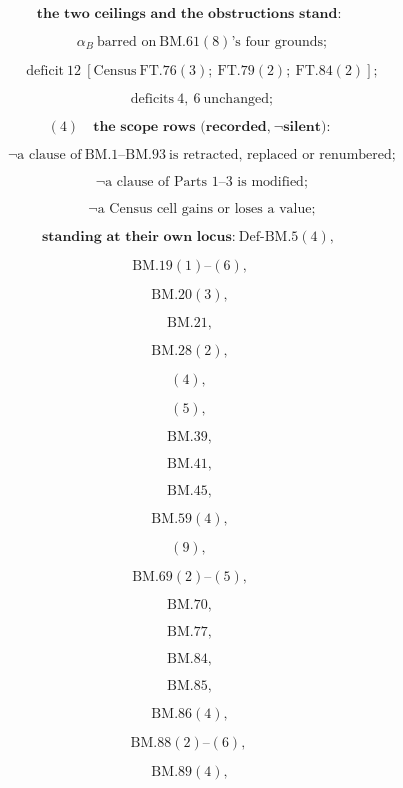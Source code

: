 \documentclass[11pt,openany]{report}
\theoremstyle{canonplain}
\theoremstyle{canondef}
\begin{document}
\[
\textbf{the two ceilings and the obstructions stand:}
\]

\[
\qquad \alpha_B\ \text{barred on}\ \mathrm{BM.61}(8)\text{'s four grounds};
\]

\[
\qquad \text{deficit}\ 12\ [\mathrm{Census\ FT.76}(3);\ \mathrm{FT.79}(2);\ \mathrm{FT.84}(2)];
\]

\[
\qquad \text{deficits}\ 4,\ 6\ \text{unchanged};
\]

\[
(4)\quad\textbf{the scope rows (recorded,}\ \neg\textbf{silent):}
\]

\[
\qquad \neg\text{a clause of}\ \mathrm{BM.1}\text{--}\mathrm{BM.93}\ \text{is retracted, replaced or renumbered};
\]

\[
\qquad \neg\text{a clause of Parts 1--3 is modified};
\]

\[
\qquad \neg\text{a Census cell gains or loses a value};
\]

\[
\textbf{standing at their own locus:}\ \mathrm{Def\text{-}BM.5}(4),
\]

\[
\ \mathrm{BM.19}(1)\text{--}(6),
\]

\[
\ \mathrm{BM.20}(3),
\]

\[
\ \mathrm{BM.21},
\]

\[
\ \mathrm{BM.28}(2),
\]

\[
(4),
\]

\[
(5),
\]

\[
\ \mathrm{BM.39},
\]

\[
\ \mathrm{BM.41},
\]

\[
\ \mathrm{BM.45},
\]

\[
\ \mathrm{BM.59}(4),
\]

\[
(9),
\]

\[
\ \mathrm{BM.69}(2)\text{--}(5),
\]

\[
\ \mathrm{BM.70},
\]

\[
\ \mathrm{BM.77},
\]

\[
\ \mathrm{BM.84},
\]

\[
\ \mathrm{BM.85},
\]

\[
\ \mathrm{BM.86}(4),
\]

\[
\mathrm{BM.88}(2)\text{--}(6),
\]

\[
\ \mathrm{BM.89}(4),
\]
\end{document}
